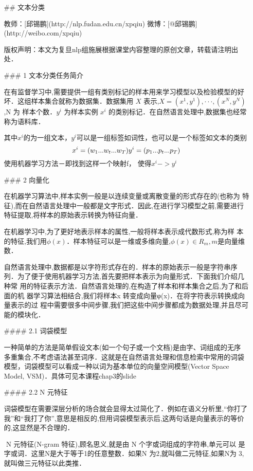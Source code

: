 ## 文本分类

教师：[邱锡鹏](http://nlp.fudan.edu.cn/xpqiu)  微博：[@邱锡鹏](http://weibo.com/xpqiu)

版权声明：本文为复旦nlp组施展根据课堂内容整理的原创文章，转载请注明出处．



### 1 文本分类任务简介

​	在有监督学习中,需要提供一组有类别标记的样本用来学习模型以及检验模型的好 坏．这组样本集合就称为数据集．数据集用 $X$ 表示,$X = {(x^1 , y^1 ), · · · , (x^N , y^N )}$,N 为 样本个数．$y^i$ 为样本实例 $x^i$ 的类别标记．在自然语言处理中,数据集也经常称为语料库．

其中$x^i$的为一组文本，$y^i$可以是一组标签如词性，也可以是一个标签如文本的类别
$$
x^i = (w_1...w_t...w_T)\\ 
y^i=(p_1...p_t...p_T)
$$
使用机器学习方法－即找到这样一个映射f， 使得$x^{i}->y^{i}$	

### 2 向量化

​	在机器学习算法中,样本实例一般是以连续变量或离散变量的形式存在的(也称为 特征),而在自然语言处理中一般都是文字形式．因此,在进行学习模型之前,需要进行 特征提取,将样本的原始表示转换为特征向量．

​	在机器学习中,为了更好地表示样本的属性,一般将样本表示成代数形式,称为样 本的特征,我们用$\phi(x)$．样本特征可以是一维或多维向量,$\phi(x) ∈ R_m,m$是向量维数．


​	自然语言处理中,数据都是以字符形式存在的．样本的原始表示一般是字符串序 列．为了便于使用机器学习方法,首先要把样本表示为向量形式．下面我们介绍几种常 用的特征表示方法．自然语言处理的,在构造了样本和样本集合之后,为了和后面的机 器学习算法相结合,我们将样本x 转变成向量φ(x)．在将字符表示转换成向量表示的过 程中需要很多中间步骤,我们把这些中间步骤都成为数据处理,并且尽可能的模块化．

#### 2.1 词袋模型

​	一种简单的方法是简单假设文本(如一个句子或一个文档)是由字、词组成的无序 多重集合,不考虑语法甚至词序．这就是在自然语言处理和信息检索中常用的词袋模型，词袋模型可以看成一种以词为基本单位的向量空间模型(Vector Space Model, VSM)．具体可见本课程chap3的slide

#### 2.2 N 元特征

​	词袋模型在需要深层分析的场合就会显得太过简化了．例如在语义分析里,“你打了 我”和“我打了你”,意思是相反的,但用词袋模型表示后,这两句话是向量表示的等价 的,这显然是不合理的．

​	N 元特征(N-gram 特征),顾名思义,就是由 N 个字或词组成的字符串,单元可以 是字或词．这里N是大于等于1的任意整数．如果N 为2,就叫做二元特征,如果N为 3,就叫做三元特征以此类推．

